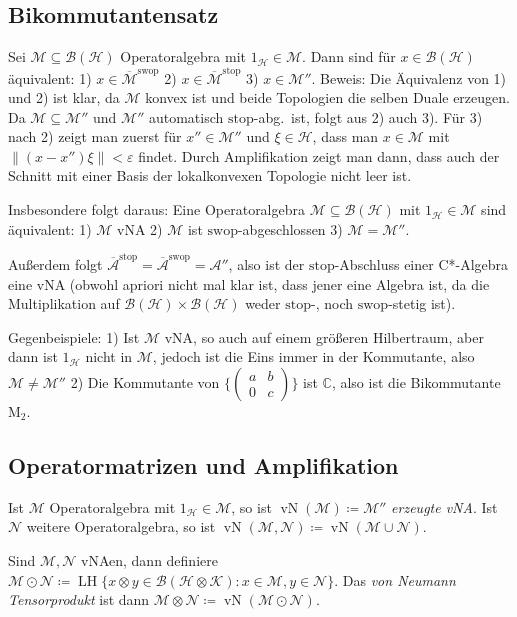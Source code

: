 \documentclass[11pt,a4paper]{scrartcl}
\newcommand{\C}{\mathbb{C}} %
\newcommand{\Hc}{\mathcal{H}}
\newcommand{\Kc}{\mathcal{K}}
\newcommand{\A}{\mathcal{A}}
\newcommand{\B}{\mathcal{B}}
\newcommand{\M}{\mathcal{M}}
\newcommand{\Nc}{\mathcal{N}}
\theoremstyle{plain}
\theoremstyle{definition}
\theoremstyle{remark}
\DeclareMathOperator{\LH}{LH}
\DeclareMathOperator{\vN}{vN}
\begin{document}
\subsection{Bikommutantensatz}

Sei $\M \subseteq \B(\Hc)$ Operatoralgebra mit $1_\Hc \in \M$. Dann sind für $x\in \B(\Hc)$ äquivalent: 1) $x\in \overline{\M}^\mathrm{swop}$ 2) $x\in \overline{\M}^\mathrm{stop}$ 3) $x\in \M''$. Beweis: Die Äquivalenz von 1) und 2) ist klar, da $\M$ konvex ist und beide Topologien die selben Duale erzeugen. Da $\M \subseteq \M''$ und $\M''$ automatisch $\mathrm{stop}$-abg.\ ist, folgt aus 2) auch 3). Für 3) nach 2) zeigt man zuerst für $x''\in \M''$ und $\xi\in \Hc$, dass man $x\in \M$ mit $\|(x-x'')\xi\| < \varepsilon$ findet. Durch Amplifikation zeigt man dann, dass auch der Schnitt mit einer Basis der lokalkonvexen Topologie nicht leer ist.

Insbesondere folgt daraus: Eine Operatoralgebra $\M\subseteq \B(\Hc)$ mit $1_\Hc\in \M$ sind äquivalent: 1) $\M$ vNA 2) $\M$ ist $\mathrm{swop}$-abgeschlossen 3) $\M=\M''$.

Außerdem folgt $\overline{\A}^\mathrm{stop}=\overline{\A}^\mathrm{swop}=\A''$, also ist der $\mathrm{stop}$-Abschluss einer C*-Algebra eine vNA (obwohl apriori nicht mal klar ist, dass jener eine Algebra ist, da die Multiplikation auf $\B(\Hc)\times \B(\Hc)$ weder $\mathrm{stop}$-, noch $\mathrm{swop}$-stetig ist).

Gegenbeispiele: 1) Ist $\M$ vNA, so auch auf einem größeren Hilbertraum, aber dann ist $1_\Hc$ nicht in $\M$, jedoch ist die Eins immer in der Kommutante, also $\M\neq\M''$ 2) Die Kommutante von $\{\left(\begin{smallmatrix} a & b \\ 0 & c \end{smallmatrix}\right)\}$ ist $\C$, also ist die Bikommutante $\mathrm{M}_2$.

\subsection{Operatormatrizen und Amplifikation}

Ist $\M$ Operatoralgebra mit $1_\Hc\in \M$, so ist $\vN(\M)\coloneqq \M''$ \emph{erzeugte vNA}. Ist $\Nc$ weitere Operatoralgebra, so ist $\vN(\M,\Nc)\coloneqq \vN(\M\cup\Nc)$.

Sind $\M,\Nc$ vNAen, dann definiere $\M\odot\Nc\coloneqq \LH \{x\otimes y \in \B(\Hc\otimes \Kc): x\in \M, y\in \Nc \}$. Das \emph{von Neumann Tensorprodukt} ist dann $\M\otimes\Nc \coloneqq \vN(\M\odot \Nc)$.
\end{document}

